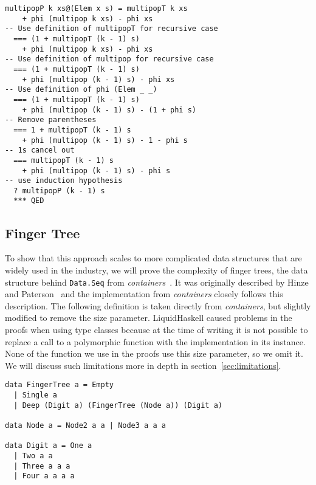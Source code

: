 \documentclass[sigplan,screen,review,anonymous]{acmart}
\begin{document}
\begin{lstlisting}
multipopP k xs@(Elem x s) = multipopT k xs
    + phi (multipop k xs) - phi xs
-- Use definition of multipopT for recursive case
  === (1 + multipopT (k - 1) s)
    + phi (multipop k xs) - phi xs
-- Use definition of multipop for recursive case
  === (1 + multipopT (k - 1) s)
    + phi (multipop (k - 1) s) - phi xs
-- Use definition of phi (Elem _ _)
  === (1 + multipopT (k - 1) s)
    + phi (multipop (k - 1) s) - (1 + phi s)
-- Remove parentheses
  === 1 + multipopT (k - 1) s
    + phi (multipop (k - 1) s) - 1 - phi s
-- 1s cancel out
  === multipopT (k - 1) s
    + phi (multipop (k - 1) s) - phi s
-- use induction hypothesis
  ? multipopP (k - 1) s
  *** QED
\end{lstlisting}

\subsection{Finger Tree}\label{sec:fingertree}

To show that this approach scales to more complicated data structures that are widely used in the industry, we will prove the complexity of finger trees, the data structure behind \texttt{Data.Seq} from \textit{containers}~\cite{containers}. It was originally described by Hinze and Paterson~\cite{fingertrees} and the implementation from \textit{containers} closely follows this description. The following definition is taken directly from \textit{containers}, but slightly modified to remove the size parameter. LiquidHaskell caused problems in the proofs when using type classes because at the time of writing it is not possible to replace a call to a polymorphic function with the implementation in its instance. None of the function we use in the proofs use this size parameter, so we omit it. We will discuss such limitations more in depth in section~\ref{sec:limitations}.

\begin{lstlisting}
data FingerTree a = Empty
  | Single a
  | Deep (Digit a) (FingerTree (Node a)) (Digit a)

data Node a = Node2 a a | Node3 a a a

data Digit a = One a
  | Two a a
  | Three a a a
  | Four a a a a
\end{lstlisting}
\end{document}
